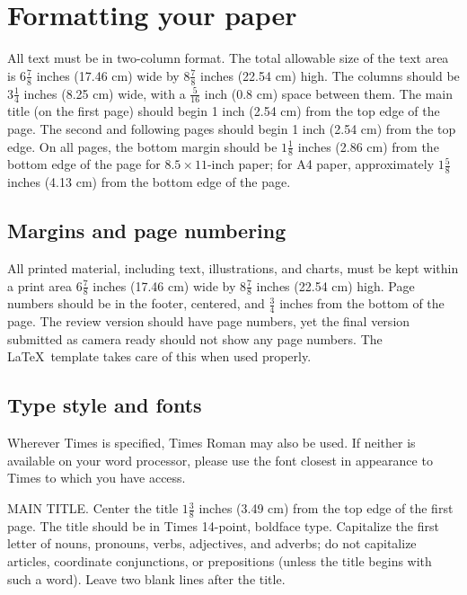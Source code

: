 \section{Formatting your paper}
\label{sec:formatting}

All text must be in two-column format.
The total allowable size of the text area is $6\frac78$ inches (17.46 cm) wide by $8\frac78$ inches (22.54 cm) high.
The columns should be $3\frac14$ inches (8.25 cm) wide, with a $\frac{5}{16}$ inch (0.8 cm) space between them.
The main title (on the first page) should begin 1 inch (2.54 cm) from the top edge of the page.
The second and following pages should begin 1 inch (2.54 cm) from the top edge.
On all pages, the bottom margin should be $1\frac{1}{8}$ inches (2.86 cm) from the bottom edge of the page for $8.5 \times 11$-inch paper;
for A4 paper, approximately $1\frac{5}{8}$ inches (4.13 cm) from the bottom edge of the
page.

\subsection{Margins and page numbering}

All printed material, including text, illustrations, and charts, must be kept
within a print area $6\frac{7}{8}$ inches (17.46 cm) wide by $8\frac{7}{8}$ inches (22.54 cm)
high.
%
Page numbers should be in the footer, centered, and $\frac{3}{4}$ inches from the bottom of the page.
The review version should have page numbers, yet the final version submitted as camera ready should not show any page numbers.
The \LaTeX\ template takes care of this when used properly.



\subsection{Type style and fonts}

Wherever Times is specified, Times Roman may also be used.
If neither is available on your word processor, please use the font closest in
appearance to Times to which you have access.

MAIN TITLE.
Center the title $1\frac{3}{8}$ inches (3.49 cm) from the top edge of the first page.
The title should be in Times 14-point, boldface type.
Capitalize the first letter of nouns, pronouns, verbs, adjectives, and adverbs;
do not capitalize articles, coordinate conjunctions, or prepositions (unless the title begins with such a word).
Leave two blank lines after the title.

